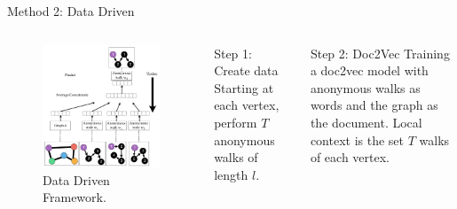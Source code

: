 \documentclass{beamer}
\begin{document}
    \begin{frame}{Method 2: Data Driven}
        \begin{columns}
                \begin{figure}
                    \centering
                    \includegraphics[width=\textwidth]{imgs/framework.png}
                    \caption{Data Driven Framework. \cite{pmlr-v80-ivanov18a}}
                    \label{fig:awdd}
                \end{figure}

                \pause
                \begin{exampleblock}{Step 1: Create data}
                    Starting at each vertex, 
                    perform $T$ anonymous walks of length $l$. 
                \end{exampleblock}
                \pause
                \begin{exampleblock}{Step 2: Doc2Vec}
                    Training a doc2vec model with anonymous walks as words and
                    the graph as the document. Local context is the set $T$
                    walks of each vertex.
                \end{exampleblock}
        \end{columns}
    \end{frame}
\end{document}
